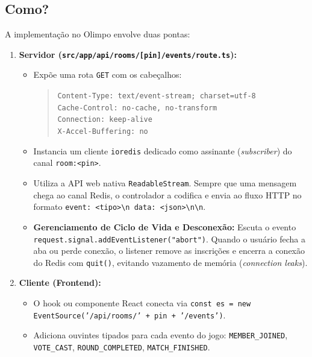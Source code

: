 \documentclass[12pt,a4paper]{article}
\begin{document}
\subsection{Como?}
A implementação no Olimpo envolve duas pontas:
\begin{enumerate}
  \item \textbf{Servidor (\texttt{src/app/api/rooms/[pin]/events/route.ts}):}
  \begin{itemize}
    \item Expõe uma rota \texttt{GET} com os cabeçalhos:
    \begin{quote}
      \texttt{Content-Type: text/event-stream; charset=utf-8}\\
      \texttt{Cache-Control: no-cache, no-transform}\\
      \texttt{Connection: keep-alive}\\
      \texttt{X-Accel-Buffering: no}
    \end{quote}
    \item Instancia um cliente \texttt{ioredis} dedicado como assinante (\textit{subscriber}) do canal \texttt{room:<pin>}.
    \item Utiliza a API web nativa \texttt{ReadableStream}. Sempre que uma mensagem chega ao canal Redis, o controlador a codifica e envia ao fluxo HTTP no formato \texttt{event: <tipo>\textbackslash n data: <json>\textbackslash n\textbackslash n}.
    \item \textbf{Gerenciamento de Ciclo de Vida e Desconexão:} Escuta o evento \texttt{request.signal.addEventListener("abort")}. Quando o usuário fecha a aba ou perde conexão, o listener remove as inscrições e encerra a conexão do Redis com \texttt{quit()}, evitando vazamento de memória (\textit{connection leaks}).
  \end{itemize}
  \item \textbf{Cliente (Frontend):}
  \begin{itemize}
    \item O hook ou componente React conecta via \texttt{const es = new EventSource('/api/rooms/' + pin + '/events')}.
    \item Adiciona ouvintes tipados para cada evento do jogo: \texttt{MEMBER\_JOINED}, \texttt{VOTE\_CAST}, \texttt{ROUND\_COMPLETED}, \texttt{MATCH\_FINISHED}.
  \end{itemize}
\end{enumerate}

\end{document}
